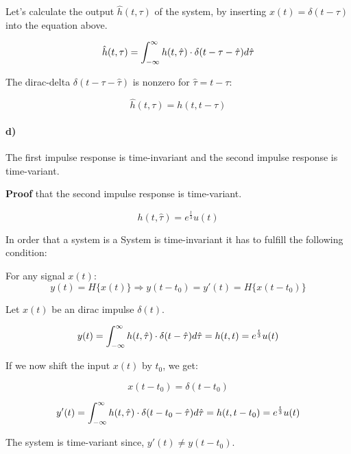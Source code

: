Let's calculate the output $\hat{h}(t,\tau)$ of the system, by inserting $x(t) = \delta(t-\tau)$
into the equation above.

\begin{equation}
 \hat{h}(t,\tau) = \int_{-\infty}^{\infty} h(t,\hat{\tau}) \cdot \delta(t-\tau - \hat{\tau}) d\hat{\tau}
\end{equation}

The dirac-delta $\delta(t-\tau - \hat{\tau})$ is nonzero for $\hat{\tau} = t-\tau$:

\begin{equation}
 \hat{h}(t,\tau) = h(t,t-\tau)
\end{equation}


\paragraph{d)}


The first impulse response is time-invariant and the second impulse response is time-variant.

\textbf{Proof} that the second impulse response is time-variant.

\begin{equation}
h(t,\hat{\tau}) = e^{\frac{t}{3}}u(t)
\end{equation}


In order that a system is a System is time-invariant it has to fulfill the following condition:

For any signal $x(t)$:
\begin{equation}
 y(t) = H\{x(t)\} \Rightarrow y(t-t_0) = y'(t) = H\{x(t-t_0)\}
\end{equation}

Let $x(t)$ be an dirac impulse $\delta(t)$.

\begin{equation}
 y(t) = \int_{-\infty}^{\infty} h(t,\hat{\tau}) \cdot \delta(t-\hat{\tau}) d\hat{\tau} = h(t,t) = e^{\frac{t}{3}}u(t)
\end{equation}

If we now shift the input $x(t)$ by $t_0$, we get:

$$
x(t-t_0) = \delta(t-t_0)
$$

\begin{equation}
 y'(t) = \int_{-\infty}^{\infty} h(t,\hat{\tau}) \cdot \delta(t-t_0-\hat{\tau}) d\hat{\tau} = h(t,t-t_0) = e^{\frac{t}{3}}u(t)
\end{equation}

The system is time-variant since, $y'(t) \neq y(t-t_0)$.





